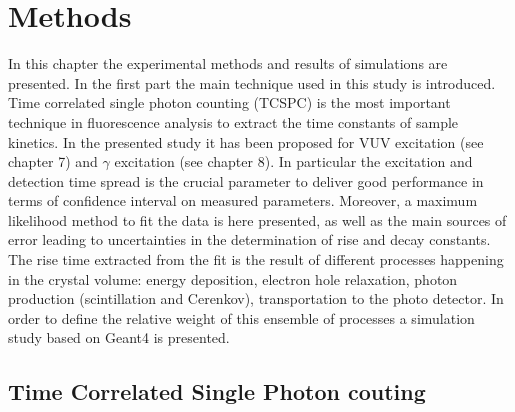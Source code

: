 
\chapter{Methods}
In this chapter the experimental methods and results of simulations are presented. 
In the first part the main technique used in this study is introduced. Time correlated single photon counting (TCSPC) is the most important technique in fluorescence analysis to extract the time constants of sample kinetics. In the presented study it has been proposed for VUV excitation (see chapter 7) and $\gamma$ excitation (see chapter 8).
In particular the excitation and detection time spread is the crucial parameter to deliver good performance in terms of confidence interval on measured parameters.
Moreover, a maximum likelihood method to fit the data is here presented, as well as the main sources of error leading to uncertainties in the determination of rise and decay constants.
The rise time extracted from the fit is the result of different processes happening in the crystal volume: energy deposition, electron hole relaxation, photon production (scintillation and Cerenkov), transportation to the photo detector. In order to define the relative weight of this ensemble of processes a simulation study based on Geant4 is presented.

\section{Time Correlated Single Photon couting}

